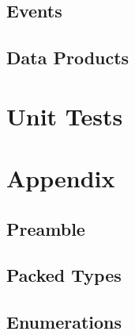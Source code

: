 

\subsection{Events}



\subsection{Data Products}



\section{Unit Tests}



\section{Appendix}

\subsection{Preamble}



\subsection{Packed Types}



\subsection{Enumerations}




